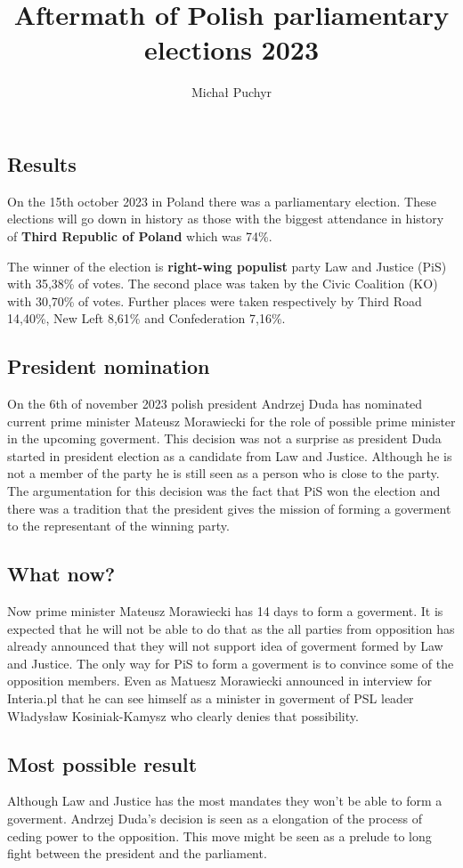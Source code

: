 \documentclass[12pt]{article}
\author{Michał Puchyr}
\title{\textbf{Aftermath of Polish parliamentary elections 2023}}
\begin{document}
\maketitle

\subsection*{Results}

On the 15th october 2023 in Poland there was a parliamentary election.
These elections will go down in history as those with the biggest attendance in history of \textbf{Third Republic of Poland} which was 74\%.

The winner of the election is \textbf{right-wing populist} party Law and Justice (PiS) with 35,38\% of votes.
The second place was taken by the Civic Coalition (KO) with 30,70\% of votes.
Further places were taken respectively by Third Road 14,40\%, New Left 8,61\% and Confederation 7,16\%.

\subsection*{President nomination}

On the 6th of november 2023 polish president Andrzej Duda has nominated current prime minister Mateusz Morawiecki for the role of possible prime minister in
the upcoming goverment. This decision was not a surprise as president Duda started in president election as a candidate from Law and Justice. Although he is not a member of the party
he is still seen as a person who is close to the party. The argumentation for this decision was the fact that PiS won the election and there was a tradition that 
the president gives the mission of forming a goverment to the representant of the winning party.

\subsection*{What now?}

Now prime minister Mateusz Morawiecki has 14 days to form a goverment. It is expected that he will not be able to do that as the all parties from opposition 
has already announced that they will not support idea of goverment formed by Law and Justice. The only way for PiS to form a goverment is to convince some of the opposition members.
Even as Matuesz Morawiecki announced in interview for Interia.pl that he can see himself as a minister in goverment of PSL leader Władysław Kosiniak-Kamysz who clearly denies
that possibility.

\subsection*{Most possible result}

Although Law and Justice has the most mandates they won't be able to form a goverment. 
Andrzej Duda's decision is seen as a elongation of the process of ceding power to the opposition.
This move might be seen as a prelude to long fight between the president and the parliament.
\end{document}
